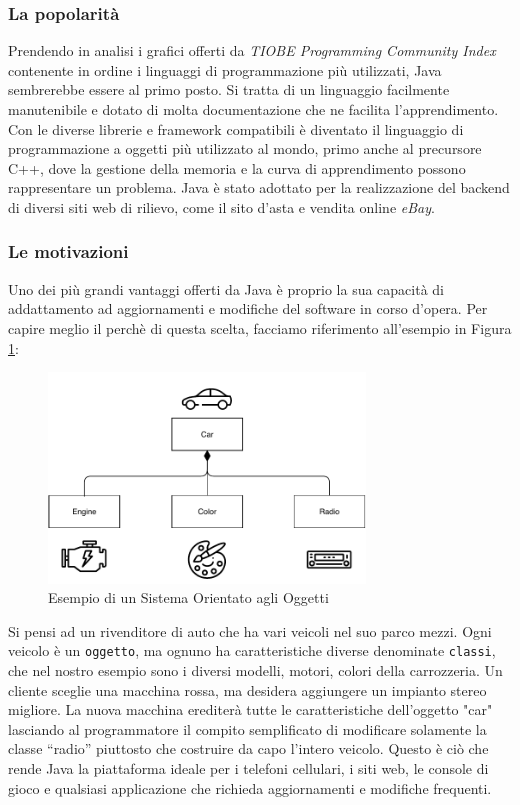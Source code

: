 \subsubsection{La popolarità}
Prendendo in analisi i grafici offerti da \emph{TIOBE Programming Community Index} \cite{jansen:tiobe} contenente in ordine i linguaggi di programmazione più utilizzati, Java sembrerebbe essere al primo posto. Si tratta di un linguaggio facilmente manutenibile e dotato di molta documentazione che ne facilita l'apprendimento. Con le diverse librerie e framework compatibili è diventato il linguaggio di programmazione a oggetti più utilizzato al mondo, primo anche al precursore C++, dove la gestione della memoria e la curva di apprendimento possono rappresentare un problema. Java è stato adottato per la realizzazione del backend di diversi siti web di rilievo, come il sito d'asta e vendita online \textit{eBay}.

\subsubsection{Le motivazioni}
Uno dei più grandi vantaggi offerti da Java è proprio la sua capacità di addattamento ad aggiornamenti e modifiche del software in corso d'opera. Per capire meglio il perchè di questa scelta, facciamo riferimento all'esempio in Figura \ref{fig:objectoriented-system}:
\begin{figure}[H]
    \centering
    \includegraphics[width=0.75\textwidth]{images/01_5_java_class_diagram.pdf}
    \caption{Esempio di un Sistema Orientato agli Oggetti}
    \label{fig:objectoriented-system}
\end{figure}
Si pensi ad un rivenditore di auto che ha vari veicoli nel suo parco mezzi. Ogni veicolo è un \texttt{oggetto}, ma ognuno ha caratteristiche diverse denominate \texttt{classi}, che nel nostro esempio sono i diversi modelli, motori, colori della carrozzeria. Un cliente sceglie una macchina rossa, ma desidera aggiungere un impianto stereo migliore. La nuova macchina erediterà tutte le caratteristiche dell'oggetto "car" lasciando al programmatore il compito semplificato di modificare solamente la classe “radio” piuttosto che costruire da capo l’intero veicolo. Questo è ciò che rende Java la piattaforma ideale per i telefoni cellulari, i siti web, le console di gioco e qualsiasi applicazione che richieda aggiornamenti e modifiche frequenti.

